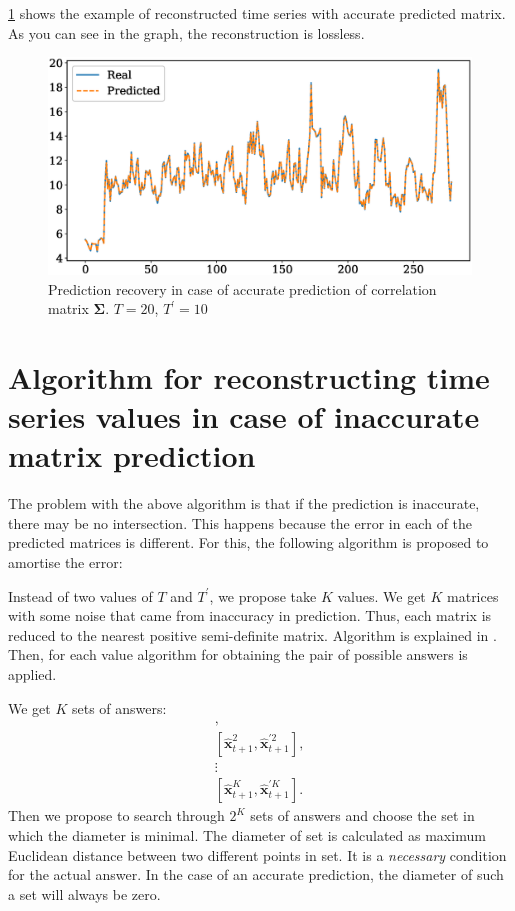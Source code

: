 \documentclass[12pt]{article}
\begin{document}
{\ref{fig:fig3} shows the example of reconstructed time series with accurate predicted matrix. As you can see in the graph, the reconstruction is lossless.

\begin{figure}[!htbp]
	\centering
	\includegraphics[width=\textwidth]{IdealRecovery.eps}
	\caption{Prediction recovery in case of accurate prediction of correlation matrix $\mathbf{\Sigma}$. $T=20$, $T^\prime=10$}
	\label{fig:fig3}
\end{figure}

\section{Algorithm for reconstructing time series values in case of inaccurate matrix prediction}

The problem with the above algorithm is that if the prediction is inaccurate, there may be no intersection. This happens because the error in each of the predicted matrices is different. For this, the following algorithm is proposed to amortise the error:

Instead of two values of $T$ and $T^\prime$, we propose take $K$ values. We get $K$ matrices with some noise that came from inaccuracy in prediction. Thus, each matrix is reduced to the nearest positive semi-definite matrix. Algorithm is explained in \cite{HIGHAM1988103}.
Then, for each value algorithm for obtaining the pair of possible answers is applied.

We get $K$ sets of answers:
\begin{gather*}
	[\hat{\mathbf{x}}_{t+1}^1, \hat{\mathbf{x}}^{\prime 1}_{t+1}],\\
	[\hat{\mathbf{x}}_{t+1}^2, \hat{\mathbf{x}}^{\prime 2}_{t+1}],\\
	\vdots \\
	[\hat{\mathbf{x}}_{t+1}^K, \hat{\mathbf{x}}^{\prime K}_{t+1}].
\end{gather*}
Then we propose to search through $2^K$ sets of answers and choose the set in which the diameter is minimal. The diameter of set is calculated as maximum Euclidean distance between two different points in set. It is a \emph{necessary} condition for the actual answer. In the case of an accurate prediction, the diameter of such a set will always be zero.

}
\end{document}
